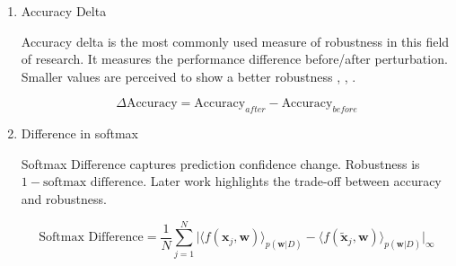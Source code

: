 \documentclass[ %
                    author={Revalda Putawara},
                supervisor={Dr. James Pope},
                    degree={MSc},
                     title={Robustness of Bayesian Neural Networks Design Choices Against Weight and Bias Perturbation Induced by Single Event Upsets (SEUs)},
                      type={},
                      year={2025}]{dissertation}
\begin{document}
\begin{enumerate}
    \item Accuracy Delta


    Accuracy delta is the most commonly used measure of robustness in this field of research. It measures the performance difference before/after perturbation. Smaller values are perceived to show a better robustness \cite{dennispoperobustcnn}, \cite{feng2024attackingbayesadversarialrobustness}, \cite{pang2021evaluatingrobustnessbayesianneural}.

    \begin{equation} \label{eq:accuracydelta}
    \Delta \text{Accuracy} = \text{Accuracy}_{after} - \text{Accuracy}_{before}
    \end{equation}
    
    \item Difference in softmax


    Softmax Difference \cite{carbone2020a} captures prediction confidence change. Robustness is $1 - \text{softmax difference}$. Later work \cite{isrobustnessdongsu2018} highlights the trade-off between accuracy and robustness.

    \begin{equation} \label{eq:softmaxdifference}
    \text{Softmax Difference} = \frac{1}{N} \sum_{j=1}^{N} 
    \Big|
    \big\langle f(\mathbf{x}_j, \mathbf{w}) \big\rangle_{p(\mathbf{w}|D)}
    -
    \big\langle f(\tilde{\mathbf{x}}_j, \mathbf{w}) \big\rangle_{p(\mathbf{w}|D)}
    \Big|_{\infty}
    \end{equation}


\end{enumerate}
\end{document}
